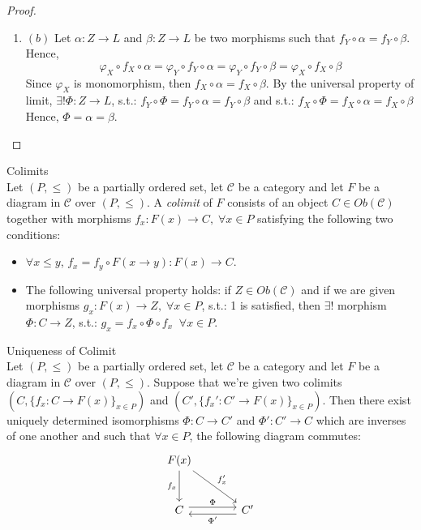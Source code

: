 \begin{proof}
    \begin{enumerate}
        \item $(b)$ Let $\alpha: Z \to L$ and $\beta: Z \to L$ be two morphisms such that $f_Y \circ \alpha = f_Y \circ \beta$. Hence,
        $$\varphi_X \circ f_X \circ \alpha = \varphi_Y \circ f_Y \circ \alpha = \varphi_Y \circ f_Y \circ \beta = \varphi_X \circ f_X \circ \beta$$
        Since $\varphi_X$ is monomorphism, then $f_X \circ \alpha = f_X \circ \beta$. By the universal property of limit, $\exists ! \Phi: Z \to L$, s.t.:
        $f_Y \circ \Phi = f_Y \circ \alpha = f_Y \circ \beta$
        and s.t.: $f_X \circ \Phi = f_X \circ \alpha = f_X \circ \beta$
        Hence, $\Phi = \alpha = \beta$.
    \end{enumerate}
\end{proof}

\begin{definition}{Colimits}\\
Let $(P,\leq)$ be a partially ordered set, let $\mathcal{C}$ be a category and let $F$ be a diagram in $\mathcal{C}$ over $(P,\leq)$. A \textit{colimit} of $F$ consists of an object $C \in Ob(\mathcal{C})$ together with morphisms $f_x :  F(x) \to C, \;\forall x \in P$ satisfying the following two conditions:
\begin{itemize}
    \item $\forall x\leq y$, $f_x = f_y \circ F(x \to y):  F(x) \to C$.
    \item The following universal property holds: if $Z \in Ob(\mathcal{C})$ and if we are given morphisms $g_x: F(x) \to Z, \;\forall x \in P$, s.t.: 1 is satisfied, then $\exists !$ morphism $\Phi: C \to Z$, s.t.: $g_x = f_x \circ \Phi \circ f_x  \;\;\forall x \in P$.
\end{itemize}
\end{definition}

\begin{proposition}{Uniqueness of Colimit}\\
Let $(P,\leq)$ be a partially ordered set, let $\mathcal{C}$ be a category and let $F$ be a diagram in $\mathcal{C}$ over $(P,\leq)$. Suppose that we're given two colimits $(C, \{f_x: C \to F(x)\}_{x\in P})$ and $(C', \{f_x': C' \to F(x)\}_{x\in P})$. Then there exist uniquely determined isomorphisms $\Phi:C \to C'$ and $\Phi': C' \to C$ which are inverses of one another and such that $\forall x \in P$, the following diagram commutes:
$$\begin{tikzcd}[row sep=large, column sep=large]
    F(x) \arrow[d, "f_x"'] \arrow[dr, "f_x'"]\\
    C \arrow[r, shift left=0.7ex, "\Phi"] &C' \arrow[l, shift left=0.7ex, "\Phi'"]
\end{tikzcd}$$
\end{proposition}

